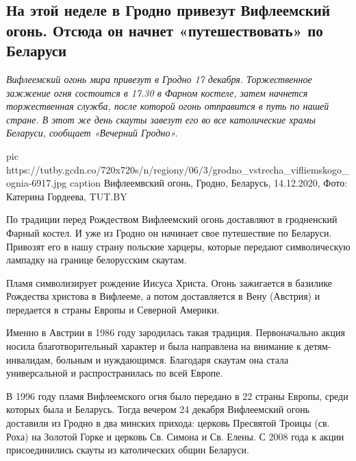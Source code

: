  
 
 
 
 
 
\subsection{На этой неделе в Гродно привезут Вифлеемский огонь. Отсюда он начнет «путешествовать» по Беларуси}
\label{sec:14_12_2020.news.by.tutby.1.ogon_vifleem}


\begin{leftbar}
	\begingroup
		\em\large Вифлеемский огонь мира привезут в Гродно 17 декабря. Торжественное
				зажжение огня состоится в 17.30 в Фарном костеле, затем начнется
				торжественная служба, после которой огонь отправится в путь по нашей
				стране. В этот же день скауты завезут его во все католические храмы
				Беларуси, сообщает «Вечерний Гродно».
	\endgroup
\end{leftbar}

\ifcmt
pic https://tutby.gcdn.co/720x720s/n/regiony/06/3/grodno_vstrecha_vifliemskogo_ognia-6917.jpg
caption Вифлеемвский огонь, Гродно, Беларусь, 14.12.2020, Фото: Катерина Гордеева, TUT.BY
\fi

По традиции перед Рождеством Вифлеемский огонь доставляют в гродненский Фарный
костел. И уже из Гродно он начинает свое путешествие по Беларуси. Привозят его
в нашу страну польские харцеры, которые передают символическую лампадку на
границе белорусским скаутам.

Пламя символизирует рождение Иисуса Христа. Огонь зажигается в базилике
Рождества христова в Вифлееме, а потом доставляется в Вену (Австрия) и
передается в страны Европы и Северной Америки.

Именно в Австрии в 1986 году зародилась такая традиция. Первоначально акция
носила благотворительный характер и была направлена на внимание к
детям-инвалидам, больным и нуждающимся. Благодаря скаутам она стала
универсальной и распространилась по всей Европе.

В 1996 году пламя Вифлеемского огня было передано в 22 страны Европы, среди
которых была и Беларусь. Тогда вечером 24 декабря Вифлеемский огонь доставили
из Гродно в два минских прихода: церковь Пресвятой Троицы (св. Роха) на Золотой
Горке и церковь Св. Симона и Св. Елены. С 2008 года к акции присоединились
скауты из католических общин Беларуси.



